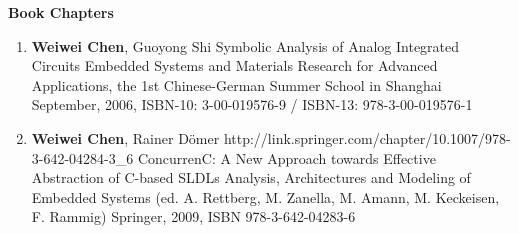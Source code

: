 \newpage
\vspace{5mm}
{\textbf{\large Book Chapters}}
\vspace{-2mm}
\begin{enumerate}

\item 
	\mypub
	{\textbf{Weiwei Chen}, Guoyong Shi}
	{Symbolic Analysis of Analog Integrated Circuits}
	{}
	{Embedded Systems and Materials Research for Advanced Applications, the 1st Chinese-German Summer School in Shanghai}
	{September, 2006, ISBN-10: 3-00-019576-9 / ISBN-13: 978-3-00-019576-1}

\item 
	\mypubhl
	{\textbf{Weiwei Chen}, Rainer D\"{o}mer}
	{http://link.springer.com/chapter/10.1007/978-3-642-04284-3_6}
	{ConcurrenC: A New Approach towards Effective Abstraction of C-based SLDLs}
	{}
	{Analysis, Architectures and Modeling of Embedded Systems (ed. A. Rettberg, M. Zanella, M. Amann, M. Keckeisen, F. Rammig)}
	{Springer, 2009, ISBN 978-3-642-04283-6}

\end{enumerate}

